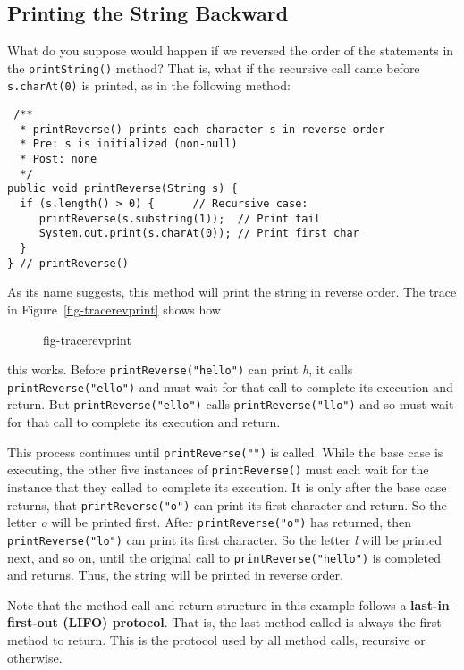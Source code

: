 \subsection{Printing the String Backward}
\noindent What do you suppose would happen if we reversed the order of the
statements in the {\tt printString()} method? That is, what
if the recursive call came before {\tt s.charAt(0)} is printed, as
in the following method:

\begin{jjjlisting}
\begin{lstlisting}
 /**
  * printReverse() prints each character s in reverse order
  * Pre: s is initialized (non-null)
  * Post: none
  */
public void printReverse(String s) {
  if (s.length() > 0) {      // Recursive case:
     printReverse(s.substring(1));  // Print tail
     System.out.print(s.charAt(0)); // Print first char
  }
} // printReverse()
\end{lstlisting}
\end{jjjlisting}

\noindent As its name suggests, this method will print the string in
reverse order.  The trace in Figure~\ref{fig-tracerevprint} shows how
\begin{figure}[h]
 {fig-tracerevprint}
\end{figure}
this works.  Before {\tt printReverse("hello")} can print {\it h}, it calls
{\tt printReverse("ello")} and must wait for that call to complete its
execution and return.  But {\tt printReverse("ello")} calls
{\tt printReverse("llo")} and so must wait for that call to complete its
execution and return.



This process continues until {\tt printReverse("")} is called.  While
the base case is executing, the other five instances of
{\tt printReverse()} must each wait for the instance that they called to
complete its execution.  It is only after the base case returns, that
{\tt printReverse("o")} can print its first character and return.   So
the letter {\it o} will be printed first.  After {\tt printReverse("o")}
has returned, then {\tt printReverse("lo")} can print its first
character.  So the letter {\it l} will be printed next, and so on, until the
original call to {\tt printReverse("hello")} is completed and
returns.  Thus, the string will be printed in reverse order.


Note that the method call and return structure in this example follows
a {\bf last-in--first-out (LIFO) protocol}. 
That is, the last method
called is always the first method to return.  This is the protocol used
by all method calls, recursive or otherwise.

